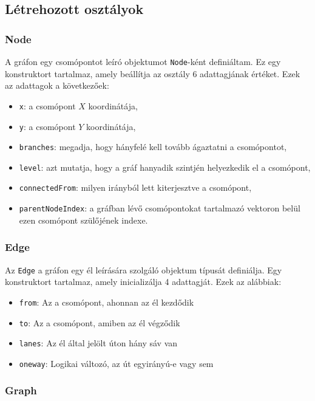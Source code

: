 \subsection{Létrehozott osztályok}

\subsubsection{Node}

A gráfon egy csomópontot leíró objektumot \texttt{Node}-ként definiáltam. Ez egy konstruktort tartalmaz, amely beállítja az osztály 6 adattagjának értéket. Ezek az adattagok a következőek:
\begin{itemize}
\item \texttt{x}: a csomópont $X$ koordinátája,
\item \texttt{y}: a csomópont $Y$ koordinátája,
\item \texttt{branches}: megadja, hogy hányfelé kell tovább ágaztatni a csomópontot,
\item \texttt{level}: azt mutatja, hogy a gráf hanyadik szintjén helyezkedik el a csomópont,
\item \texttt{connectedFrom}: milyen irányból lett kiterjesztve a csomópont,
\item \texttt{parentNodeIndex}: a gráfban lévő csomópontokat tartalmazó vektoron belül ezen csomópont szülőjének indexe.
\end{itemize}

\subsubsection{Edge}

Az \texttt{Edge} a gráfon egy él leírására szolgáló objektum típusát definiálja. Egy konstruktort tartalmaz, amely inicializálja 4 adattagját. Ezek az alábbiak:
\begin{itemize}
\item \texttt{from}: Az a csomópont, ahonnan az él kezdődik
\item \texttt{to}: Az a csomópont, amiben az él végződik
\item \texttt{lanes}: Az él által jelölt úton hány sáv van
\item \texttt{oneway}: Logikai változó, az út egyirányú-e vagy sem
\end{itemize}

\subsubsection{Graph}

